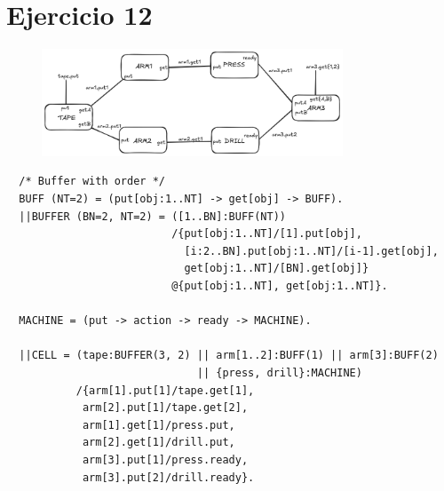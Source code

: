 \documentclass{article}
\begin{document}
\section*{Ejercicio 12}
\begin{figure}[ht]
	\includegraphics[width=0.8\textwidth]{01-12.png}
	\centering
\end{figure}
\begin{verbatim}
  /* Buffer with order */ 
  BUFF (NT=2) = (put[obj:1..NT] -> get[obj] -> BUFF).
  ||BUFFER (BN=2, NT=2) = ([1..BN]:BUFF(NT))
                          /{put[obj:1..NT]/[1].put[obj],
                            [i:2..BN].put[obj:1..NT]/[i-1].get[obj],
                            get[obj:1..NT]/[BN].get[obj]}
                          @{put[obj:1..NT], get[obj:1..NT]}.

  MACHINE = (put -> action -> ready -> MACHINE).

  ||CELL = (tape:BUFFER(3, 2) || arm[1..2]:BUFF(1) || arm[3]:BUFF(2)
                              || {press, drill}:MACHINE)
           /{arm[1].put[1]/tape.get[1],
            arm[2].put[1]/tape.get[2],
            arm[1].get[1]/press.put,
            arm[2].get[1]/drill.put,
            arm[3].put[1]/press.ready,
            arm[3].put[2]/drill.ready}.
\end{verbatim}
\end{document}
